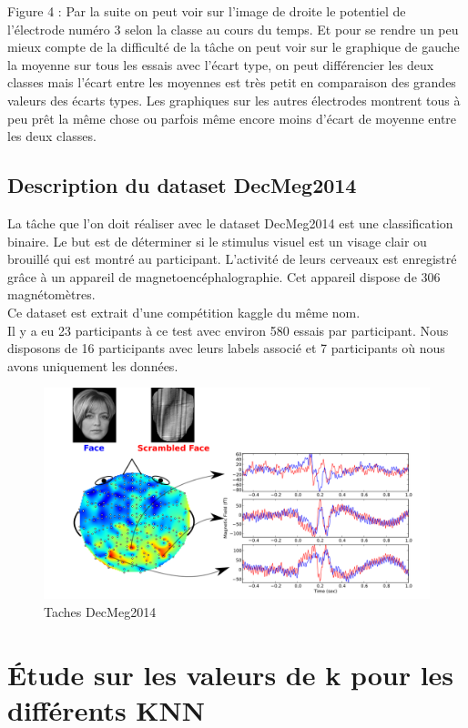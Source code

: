 \documentclass{article}[12pt]
\begin{document}
    
Figure 4 : Par la suite on peut voir sur l'image de droite le potentiel de l’électrode numéro 3 selon la classe au cours du temps. Et pour se rendre un peu mieux compte de la difficulté de la tâche on peut voir sur le graphique de gauche la moyenne sur tous les essais avec l’écart type, on peut différencier les deux classes mais l’écart entre les moyennes est très petit en comparaison des grandes valeurs des écarts types. Les graphiques sur les autres électrodes montrent tous à peu prêt la même chose ou parfois même encore moins d’écart de moyenne entre les deux classes.

\subsection{Description du dataset DecMeg2014}
La tâche que l'on doit réaliser avec le dataset DecMeg2014 est une classification binaire. Le but est de déterminer si le stimulus visuel est un visage clair ou brouillé qui est montré au participant. L'activité de leurs cerveaux est enregistré grâce à un appareil de magnetoencéphalographie. Cet appareil dispose de 306 magnétomètres.
\\
Ce dataset est extrait d'une compétition kaggle du même nom.
\\
Il y a eu 23 participants à ce test avec environ 580 essais par participant. Nous disposons de 16 participants avec leurs labels associé et 7 participants où nous avons uniquement les données.
\begin{figure}[H]
\begin{center}
\includegraphics[scale=0.4]{images/DECMEG2014.png}
\end{center}
\caption{Taches DecMeg2014}
\end{figure}


\section{Étude sur les valeurs de k pour les différents KNN}
\end{document}
